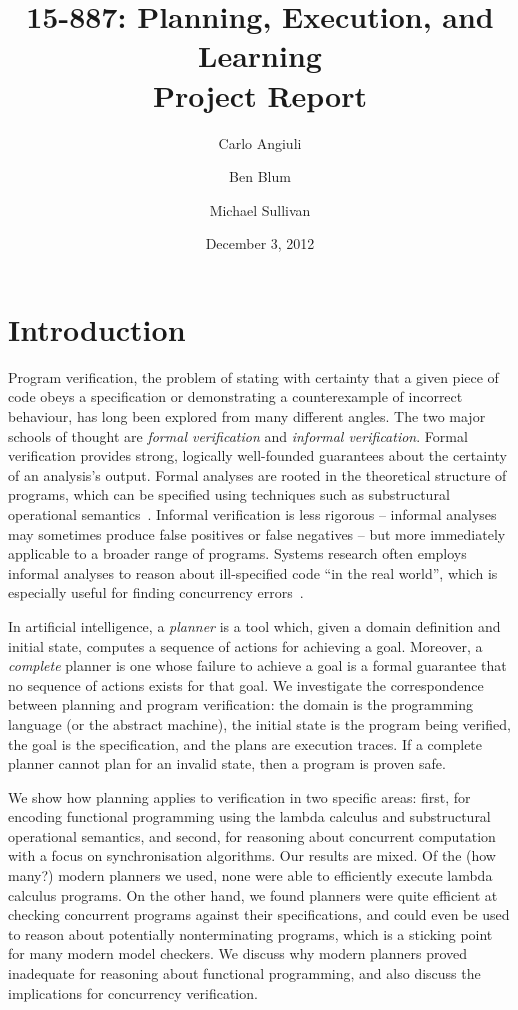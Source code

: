\documentclass{article}
\title{
{\large 15-887: Planning, Execution, and Learning}\\
Project Report}
\author{Carlo Angiuli \and Ben Blum \and Michael Sullivan}
\date{December 3, 2012}
\begin{document}
\maketitle

\abstract{
}

\section{Introduction}

Program verification, the problem of stating with certainty that a given piece of code obeys a specification or demonstrating a counterexample of incorrect behaviour, has long been explored from many different angles.
The two major schools of thought are {\em formal verification} and {\em informal verification}.
Formal verification provides strong, logically well-founded guarantees about the certainty of an analysis's output.
Formal analyses are rooted in the theoretical structure of programs, which can be specified using techniques such as substructural operational semantics~\cite{rob}.
Informal verification is less rigorous -- informal analyses may sometimes produce false positives or false negatives -- but more immediately applicable to a broader range of programs.
Systems research often employs informal analyses to reason about ill-specified code ``in the real world'', which is especially useful for finding concurrency errors~\cite{ben}.

In artificial intelligence, a {\em planner} is a tool which, given a domain definition and initial state, computes a sequence of actions for achieving a goal.
Moreover, a {\em complete} planner is one whose failure to achieve a goal is a formal guarantee that no sequence of actions exists for that goal.
We investigate the correspondence between planning and program verification: the domain is the programming language (or the abstract machine), the initial state is the program being verified, the goal is the specification, and the plans are execution traces.
If a complete planner cannot plan for an invalid state, then a program is proven safe.

We show how planning applies to verification in two specific areas: first, for encoding functional programming using the lambda calculus and substructural operational semantics,
and second, for reasoning about concurrent computation with a focus on synchronisation algorithms.
Our results are mixed.
Of the (how many?) modern planners we used, none were able to efficiently execute lambda calculus programs. %
On the other hand, we found planners were quite efficient at checking concurrent programs against their specifications,
and could even be used to reason about potentially nonterminating programs, which is a sticking point for many modern model checkers. %
We discuss why modern planners proved inadequate for reasoning about functional programming, and also discuss the implications for concurrency verification.
\end{document}
